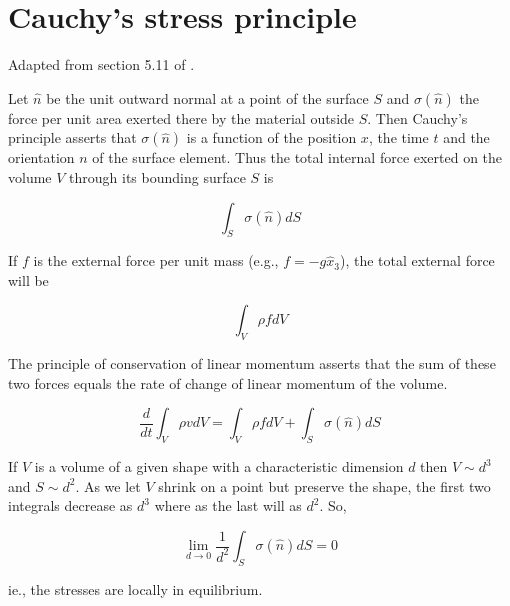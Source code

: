 \section{Cauchy's stress principle}
\label{cauchy}

Adapted from section 5.11 of \cite{aris}.

Let $\hat{n}$ be the unit outward normal at a point of the surface $S$ and $\sigma(\hat{n})$ the force per unit area exerted there by the material outside $S$. Then Cauchy's principle asserts that $\sigma(\hat{n})$ is a function of the position $x$, the time $t$ and the orientation $n$ of the surface element. Thus the total internal force exerted on the volume $V$ through its bounding surface $S$ is 

$$ \int_{S}{\sigma(\hat{n}) dS } $$

If $f$ is the external force per unit mass (e.g., $f=-g\hat{x}_3$), the total external force will be 

$$ \int_{V}{\rho f dV} $$

The principle of conservation of linear momentum asserts that the sum of these two forces equals the rate of change of linear momentum of the volume.

$$ \frac{d}{dt} \int_{V}{\rho v dV} = \int_{V}{\rho f dV} +  \int_{S}{\sigma(\hat{n}) dS } $$ 

If $V$ is a volume of a given shape with a characteristic dimension $d$ then $V \sim d^3$ and $S \sim d^2$. As we let $V$ shrink on a point but preserve the shape, the first two integrals decrease as $d^3$ where as the last will as $d^2$. So,

$$ \lim_{d \to 0}{\frac{1}{d^2}\int_{S}{\sigma(\hat{n}) dS}} = 0 $$

ie., the stresses are locally in equilibrium.


